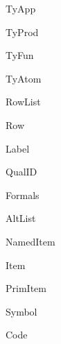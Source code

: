\documentclass[11pt]{article}
\begin{document}
\begin{Grammar}
\begin{Rules}{TyApp}
\end{Rules}

\begin{Rules}{TyProd}
\end{Rules}

\begin{Rules}{TyFun}
\end{Rules}

\begin{Rules}{TyAtom}
\end{Rules}

\begin{Rules}{RowList}
\end{Rules}

\begin{Rules}{Row}
\end{Rules}

\begin{Rules}{Label}
\end{Rules}

\begin{Rules}{QualID}
\end{Rules}

\begin{Rules}{Formals}
\end{Rules}

\begin{Rules}{AltList}
\end{Rules}


\begin{Rules}{NamedItem}
\end{Rules}

\begin{Rules}{Item}
\end{Rules}

\begin{Rules}{PrimItem}
\end{Rules}

\begin{Rules}{Symbol}
\end{Rules}

\begin{Rules}{Code}
\end{Rules}

\end{Grammar}
\end{document}
